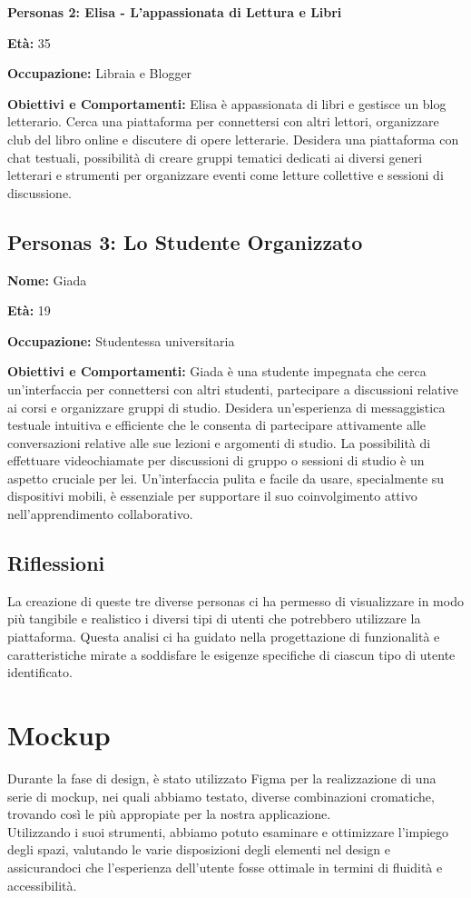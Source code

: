 %
%
%
\textbf{Personas 2: Elisa - L'appassionata di Lettura e Libri}

\textbf{Età:} 35

\textbf{Occupazione:} Libraia e Blogger

\textbf{Obiettivi e Comportamenti:} Elisa è appassionata di libri e gestisce un blog letterario. Cerca una piattaforma per connettersi con altri lettori, organizzare club del libro online e discutere di opere letterarie. Desidera una piattaforma con chat testuali, possibilità di creare gruppi tematici dedicati ai diversi generi letterari e strumenti per organizzare eventi come letture collettive e sessioni di discussione.

%
%
%
\subsection{Personas 3: Lo Studente Organizzato}

\textbf{Nome:} Giada

\textbf{Età:} 19

\textbf{Occupazione:} Studentessa universitaria

\textbf{Obiettivi e Comportamenti:} Giada è una studente impegnata che cerca un'interfaccia per connettersi con altri studenti, partecipare a discussioni relative ai corsi e organizzare gruppi di studio. Desidera un'esperienza di messaggistica testuale intuitiva e efficiente che le consenta di partecipare attivamente alle conversazioni relative alle sue lezioni e argomenti di studio. La possibilità di effettuare videochiamate per discussioni di gruppo o sessioni di studio è un aspetto cruciale per lei. Un'interfaccia pulita e facile da usare, specialmente su dispositivi mobili, è essenziale per supportare il suo coinvolgimento attivo nell'apprendimento collaborativo.

%
%
%
\subsection{Riflessioni}

La creazione di queste tre diverse personas ci ha permesso di visualizzare in modo più tangibile e realistico i diversi tipi di utenti che potrebbero utilizzare la piattaforma. Questa analisi ci ha guidato nella progettazione di funzionalità e caratteristiche mirate a soddisfare le esigenze specifiche di ciascun tipo di utente identificato.

%
%
%
\section{Mockup}
Durante la fase di design, è stato utilizzato Figma per la realizzazione di una serie di mockup, nei quali abbiamo testato, diverse combinazioni cromatiche, trovando così le più appropiate per la nostra applicazione.
\\
%
Utilizzando i suoi strumenti, abbiamo potuto esaminare e ottimizzare l'impiego degli spazi, valutando le varie disposizioni degli elementi nel design e assicurandoci che l'esperienza dell'utente fosse ottimale in termini di fluidità e accessibilità.

